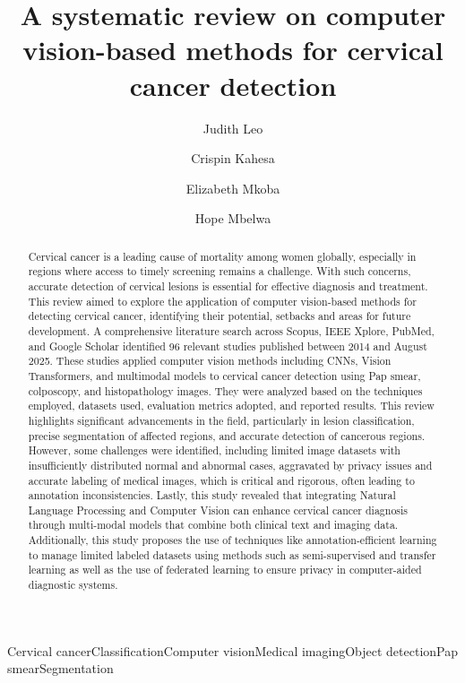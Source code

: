 \documentclass[final,5p,times,twocolumn,authoryear]{elsarticle}
\begin{document}
\begin{frontmatter}
\title{A systematic review on computer vision-based methods for cervical cancer detection}
\author[aff1]{Judith Leo}
\author[aff2]{Crispin Kahesa}
\author[aff1]{Elizabeth Mkoba}
\author[aff1]{Hope Mbelwa}
\begin{abstract}
Cervical cancer is a leading cause of mortality among women globally, especially in regions where access to timely screening remains a challenge. With such concerns, accurate detection of cervical lesions is essential for effective diagnosis and treatment. This review aimed to explore the application of computer vision-based methods for detecting cervical cancer, identifying their potential, setbacks and areas for future development. A comprehensive literature search across Scopus, IEEE Xplore, PubMed, and Google Scholar identified 96 relevant studies published between 2014 and August 2025. These studies applied computer vision methods including CNNs, Vision Transformers, and multimodal models to cervical cancer detection using Pap smear, colposcopy, and histopathology images. They were analyzed based on the techniques employed, datasets used, evaluation metrics adopted, and reported results. This review highlights significant advancements in the field, particularly in lesion classification, precise segmentation of affected regions, and accurate detection of cancerous regions. However, some challenges were identified, including limited image datasets with insufficiently distributed normal and abnormal cases, aggravated by privacy issues and accurate labeling of medical images, which is critical and rigorous, often leading to annotation inconsistencies. Lastly, this study revealed that integrating Natural Language Processing and Computer Vision can enhance cervical cancer diagnosis through multi-modal models that combine both clinical text and imaging data. Additionally, this study proposes the use of techniques like annotation-efficient learning to manage limited labeled datasets using methods such as semi-supervised and transfer learning as well as the use of federated learning to ensure privacy in computer-aided diagnostic systems.
\end{abstract}
\begin{keyword}
Cervical cancerClassificationComputer visionMedical imagingObject detectionPap smearSegmentation
\end{keyword}
\end{frontmatter}
\end{document}
